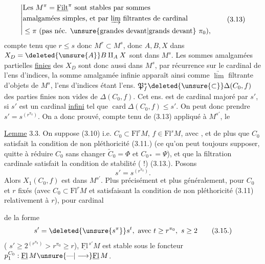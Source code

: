 \[
\left|\begin{aligned}
&\text{Les }M^\pi=\underline{\mathrm{Filt}}^\pi\text{ sont stables par sommes}\\
&\text{amalgamées simples, et par }\underrightarrow{\lim}\text{ filtrantes de cardinal}\\
&\leq\pi\text{ (pas néc. } \unsure{\text{grandes devant}|\text{grands devant}}\ \pi_0),
\end{aligned}\right.
\tag*{(3.13)}
\]
compte tenu que $r\leq s$ donc $M^r\subset M^s$, donc
$A,B,X$ dans $X_D=\deleted{\unsure{A}}B\amalg_A X$ sont dans $M^s$. Les sommes
amalgamées partielles \uline{finies} des $X_D$ sont
donc aussi dans $M^s$, par récurrence sur le
cardinal de l'ens d'indices,  la somme
amalgamée infinie apparaît ainsi comme
$\underrightarrow{\lim}$ filtrante d'objets de $M^s$, l'ens d'indices
étant l'ens. $\mathfrak P_f^*\deleted{\unsure{\subset}}\Delta(C_0,f)$ des parties finies
non vides de $\Delta(C_0,f)$. Cet ens. est de
cardinal majoré par  $s'$,  si $s'$ est un cardinal \uline{infini} tel que
$\operatorname{card}\Delta(C_0,f)\leq s'$. On peut donc prendre $s'=s^{(r^{\pi_0})}$.
On a donc prouvé, compte tenu de (3.13)
appliqué à $M^{s'}$, le

\uline{Lemme} 3.3. On suppose (3.10) i.e. $C_0\subset\mathrm{Fl}^rM$,
$f\in\mathrm{Fl}^sM$, avec  ,
et de plus que $C_0$ satisfait la condition de non pléthoricité (3.11.)
(ce qu'on peut toujours supposer, quitte à réduire
$C_0$ sans changer $\widetilde C_0=\Phi$  et $C_{0*}=\Psi$), et
que la filtration cardinale satisfait la condition
de stabilité ( !) (3.13.). Posons
\[
s'=s^{(r^{\pi_0})}.
\]
Alors $X_1(C_0,f)$ est dans $M^{s'}$. Plus précisément et
plus généralement, pour $C_0$ et $r$ fixés (avec $C_0\subset\mathrm{Fl}^rM$
et satisfaisant la condition de non pléthoricité
(3.11) relativement à $r$), pour  cardinal

de la forme
\[
s'=\deleted{\unsure{s^{\pi}}}s^t,\ \text{avec }t\geq r^{\pi_0},\ s\geq2
\tag*{(3.15.)}
\]
(\uline{} $s'\geq2^{(r^{\pi_0})}>r^{\pi_0}\geq r$), $\underline{\mathrm{Fl}}^{\,s'}M$ est stable sous le
foncteur $p_1^{C_0}:\underline{\mathrm{Fl}}\,M\unsure{\text{---}|\longrightarrow}\underline{\mathrm{Fl}}\,M$.

